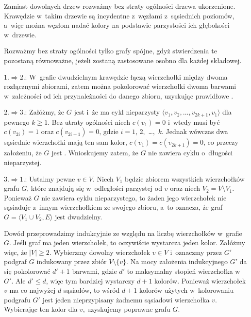 \problems


\subproblem %
Zamiast dowolnych drzew rozważmy bez straty ogólności drzewa ukorzenione. Krawędzie w~takim drzewie są incydentne z~węzłami z~sąsiednich poziomów, a~więc można węzłom nadać kolory na podstawie parzystości ich głębokości w~drzewie.

\subproblem %
Rozważmy bez straty ogólności tylko grafy spójne, gdyż stwierdzenia te pozostaną równoważne, jeżeli zostaną zastosowane osobno dla każdej składowej.
\medskip

$1.\Rightarrow 2.$: W~grafie dwudzielnym krawędzie łączą wierzchołki między dwoma rozłącznymi zbiorami, zatem można pokolorować wierzchołki dwoma barwami w~zależności od ich przynależności do danego zbioru, uzyskując prawidłowe .
\medskip

$2.\Rightarrow 3.$: Załóżmy, że $G$ jest  i~że ma cykl nieparzysty $\langle v_1,v_2,\dots,v_{2k+1},v_1\rangle$ dla pewnego $k\ge1$. Bez utraty ogólności niech $c(v_1)=0$ i~wtedy musi być $c(v_{2i})=1$ oraz $c(v_{2i+1})=0$, gdzie $i=1$, 2,~\dots,~$k$. Jednak wówczas dwa sąsiednie wierzchołki mają ten sam kolor, $c(v_1)=c(v_{2k+1})=0$, co przeczy założeniu, że $G$ jest . Wnioskujemy zatem, że $G$ nie zawiera cyklu o~długości nieparzystej.
\medskip

$3.\Rightarrow 1.$: Ustalmy pewne $v\in V$. Niech $V_1$ będzie zbiorem wszystkich wierzchołków grafu $G$, które znajdują się w~odległości parzystej od $v$ oraz niech $V_2=V\setminus V_1$. Ponieważ $G$ nie zawiera cyklu nieparzystego, to żaden jego wierzchołek nie sąsiaduje z~innym wierzchołkiem ze swojego zbioru, a~to oznacza, że graf $G=\langle V_1\cup V_2,E\rangle$ jest dwudzielny.

\subproblem %
Dowód przeprowadzimy indukcyjnie ze względu na liczbę wierzchołków w~grafie $G$. Jeśli graf ma jeden wierzchołek, to oczywiście wystarcza jeden kolor. Załóżmy więc, że $|V|\ge2$. Wybierzmy dowolny wierzchołek $v\in V$ i~oznaczmy przez $G'$ podgraf $G$ indukowany przez zbiór $V\setminus\{v\}$. Na mocy założenia indukcyjnego $G'$ da się pokolorować $d'+1$ barwami, gdzie $d'$ to maksymalny stopień wierzchołka w~$G'$. Ale $d'\le d$, więc tym bardziej wystarczy $d+1$ kolorów. Ponieważ wierzchołek $v$ ma co najwyżej $d$ sąsiadów, to wśród $d+1$ kolorów użytych w~kolorowaniu podgrafu $G'$ jest jeden nieprzypisany żadnemu sąsiadowi wierzchołka $v$. Wybierając ten kolor dla $v$, uzyskujemy poprawne  grafu $G$.

